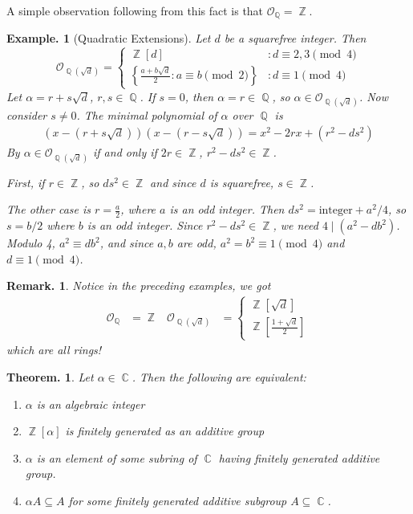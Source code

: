 \documentclass[11pt, a4paper]{memoir}
\DeclareMathOperator{\Q}{{\mathbb{Q}}}
\DeclareMathOperator{\Z}{{\mathbb{Z}}}
\DeclareMathOperator{\C}{{\mathbb{C}}}
\theoremstyle{change}
\newtheorem{theorem}{Theorem.}[section]
\theoremstyle{plain}
\theoremstyle{nonumberplain}
\newtheorem{example}{Example.}
\newtheorem{remark}{Remark.}
\numberwithin{equation}{section}
\begin{document}
A simple observation following from this fact is that $\mathcal{O}_{\Q}=\Z$.
\begin{example}[Quadratic Extensions]
    Let $d$ be a squarefree integer.
    Then
    \begin{equation*}
        \mathcal{O}_{\Q(\sqrt{d})}=\begin{cases}
            \Z[d] &:d\equiv 2,3\pmod{4}\\
            \left\{\frac{a+b\sqrt{d}}{2}: a\equiv b\pmod{2}\right\} &:d\equiv 1\pmod{4}
        \end{cases}
    \end{equation*}
    Let $\alpha=r+s\sqrt{d}$, $r,s\in\Q$.
    If $s=0$, then $\alpha=r\in\Q$, so $\alpha\in\mathcal{O}_{\Q(\sqrt{d})}$.
    Now consider $s\neq 0$.
    The minimal polynomial of $\alpha$ over $\Q$ is
    \begin{align*}
        \left(x-(r+s\sqrt{d})\right)\left(x-(r-s\sqrt{d})\right) = x^2-2rx+(r^2-ds^2)
    \end{align*}
    By $\alpha\in\mathcal{O}_{\Q(\sqrt{d})}$ if and only if $2r\in\Z$, $r^2-ds^2\in\Z$.

    First, if $r\in\Z$, so $ds^2\in\Z$ and since $d$ is squarefree, $s\in\Z$.

    The other case is $r=\frac{a}{2}$, where $a$ is an odd integer.
    Then $ds^2=\text{integer}+a^2/4$, so $s=b/2$ where $b$ is an odd integer.
    Since $r^2-ds^2\in\Z$, we need $4\mid(a^2-db^2)$.
    Modulo 4, $a^2\equiv db^2$, and since $a,b$ are odd, $a^2=b^2\equiv 1\pmod{4}$ and $d\equiv 1\pmod{4}$.
\end{example}
\begin{remark}
    Notice in the preceding examples, we got
    \begin{align*}
        \mathcal{O}_{\Q}&=\Z&\mathcal{O}_{\Q(\sqrt{d})}&=\begin{cases}
            \Z[\sqrt{d}]\\\Z\left[\frac{1+\sqrt{d}}{2}\right]
        \end{cases}
    \end{align*}
    which are all rings!
\end{remark}
\begin{theorem}\label{t:alg-int}
    Let $\alpha\in\C$.
    Then the following are equivalent:
    \begin{enumerate}[nl,r]
        \item $\alpha$ is an algebraic integer
        \item $\Z[\alpha]$ is finitely generated as an additive group
        \item $\alpha$ is an element of some subring of $\C$ having finitely generated additive group.
        \item $\alpha A\subseteq A$ for some finitely generated additive subgroup $A\subseteq\C$.
    \end{enumerate}
\end{theorem}
\end{document}
